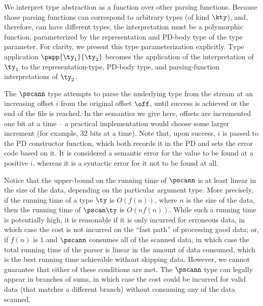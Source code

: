 We interpret type abstraction as a function over other parsing
functions. Because those parsing functions can correspond to arbitrary
\ddca{} types (of kind $\kty$), and, therefore, can have different
\fomega{} types, the interpretation must be a polymorphic function,
parameterized by the representation and PD-body type of the \ddca{}
type parameter.  For clarity, we present this type parameterization
explicitly.  Type application $\papp {\ty_1}{\ty_2}$ becomes the
application of the interpretation of $\ty_1$ to the
representation-type, PD-body type, and parsing-function
interpretations of $\ty_2$.

The $\pscann$ type attempts to parse the underlying type from the
stream at an increasing offset $i$ from the original offset
$\off$, until success is achieved or the end of the file is reached.
In the semantics we give here, offsets are incremented one bit at a
time -- a practical implementation would choose some larger increment
(for example, 32 bits at a time).  Note that, upon success, $i$ is
passed to the PD constructor function, which both records it in the PD
and sets the error code based on it.  It is considered a semantic
error for the value to be found at a positive $i$, whereas it is a
syntactic error for it not to be found at all.

Notice that the upper-bound on the running time of $\pscann$ is at
least linear in the size of the data, depending on the particular
argument type. More precisely, if the running time of a type $\ty$ is
$O(f(n))$, where $n$ is the size of the data, then the running time of
$\pscan \ty$ is $O(n f(n))$. While such a running time is potentially
high, it is reasonable if it is only incurred for erroneous data, in
which case the cost is not incurred on the ``fast path'' of processing
good data; or, if $f(n)$ is $1$ and $\pscann$ consumes all of the
scanned data, in which case the total running time of the parser is
linear in the amount of data consumed, which is the best running time
achievable without skipping data.  However, we cannot guarantee that
either of these conditions are met. The $\pscann$ type can legally
appear in branches of sums, in which case the cost could be incurred
for valid data (that matches a different branch) without consuming any
of the data scanned.

